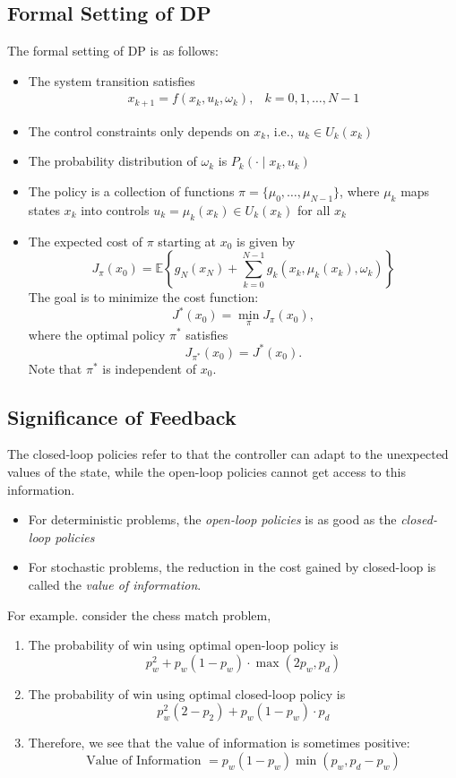 \subsection{Formal Setting of DP}
The formal setting of DP is as follows:
\begin{itemize}
\item
The system transition satisfies
\[
\begin{array}{ll}
x_{k+1} = f(x_k,u_k,\omega_k),&k=0,1,\dots,N-1
\end{array}
\]
\item
The control constraints only depends on $x_k$, i.e., $u_k\in U_k(x_k)$
\item
The probability distribution of $\omega_k$ is $P_k(\cdot\mid x_k,u_k)$
\item
The policy is a collection of functions $\pi = \{\mu_0,\dots,\mu_{N-1}\}$, where $\mu_k$ maps states $x_k$ into controls $u_k = \mu_k(x_k) \in U_k(x_k)$ for all $x_k$
\item
The expected cost of $\pi$ starting at $x_0$ is given by
\[
J_{\pi}(x_0)
=
\mathbb{E}
\left\{
g_N(x_N)+\sum_{k=0}^{N-1}g_k(x_k,\mu_k(x_k),\omega_k)
\right\}
\]
The goal is to minimize the cost function:
\[
J^*(x_0) = \min_{\pi}J_{\pi}(x_0),
\]
where the optimal policy $\pi^*$ satisfies
\[
J_{\pi^*}(x_0) = J^*(x_0).
\]
Note that $\pi^*$ is independent of $x_0$.
\end{itemize}

\subsection{Significance of Feedback}
The closed-loop policies refer to that the controller can adapt to the unexpected values of the state, while the open-loop policies cannot get access to this information.
\begin{itemize}
\item
For deterministic problems, the \emph{open-loop policies} is as good as the \emph{closed-loop policies}
\item
For stochastic problems, the reduction in the cost gained by closed-loop is called the \emph{value of information}.
\end{itemize}

For example. consider the chess match problem,
\begin{enumerate}
\item
The probability of win using optimal open-loop policy is
\[
p_w^2 + p_w(1-p_w)\cdot \max(2p_w,p_d)
\]
\item
The probability of win using optimal closed-loop policy is
\[
p_w^2(2-p_2) + p_w(1-p_w)\cdot p_d
\]
\item
Therefore, we see that the value of information is sometimes positive:
\[
\text{Value of Information }= p_w(1-p_w)\min(p_w,p_d-p_w)
\]
\end{enumerate}
